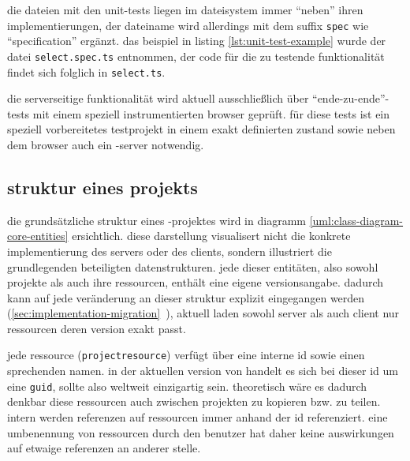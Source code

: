 die dateien mit den unit-tests liegen im dateisystem immer "`neben"' ihren implementierungen, der dateiname wird allerdings mit dem suffix \lstinline{spec} wie "`specification"' ergänzt. das beispiel in listing  \ref{lst:unit-test-example} wurde der datei \lstinline{select.spec.ts} entnommen, der code für die zu testende funktionalität findet sich folglich in \lstinline{select.ts}.



die serverseitige funktionalität wird aktuell ausschließlich über "`ende-zu-ende"'-tests mit einem speziell instrumentierten browser geprüft. für diese tests ist ein speziell vorbereitetes testprojekt in einem exakt definierten zustand sowie neben dem browser auch ein \idename-server notwendig.

\subsection{struktur eines projekts}

die grundsätzliche struktur eines \idename-projektes wird in diagramm \ref{uml:class-diagram-core-entities} ersichtlich. diese darstellung visualisert nicht die konkrete implementierung des servers oder des clients, sondern illustriert die grundlegenden beteiligten datenstrukturen. jede dieser entitäten, also sowohl projekte als auch ihre ressourcen, enthält eine eigene versionsangabe. dadurch kann auf jede veränderung an dieser struktur explizit eingegangen werden (\ref{sec:implementation-migration}~), aktuell laden sowohl server als auch client nur ressourcen deren version exakt passt.

jede ressource (\lstinline{projectresource}) verfügt über eine interne id sowie einen sprechenden namen. in der aktuellen version von \idename handelt es sich bei dieser id um eine \lstinline{guid}, sollte also weltweit einzigartig sein. theoretisch wäre es dadurch denkbar diese ressourcen auch zwischen projekten zu kopieren bzw. zu teilen. intern werden referenzen auf ressourcen immer anhand der id referenziert. eine umbenennung von ressourcen durch den benutzer hat daher keine auswirkungen auf etwaige referenzen an anderer stelle.

